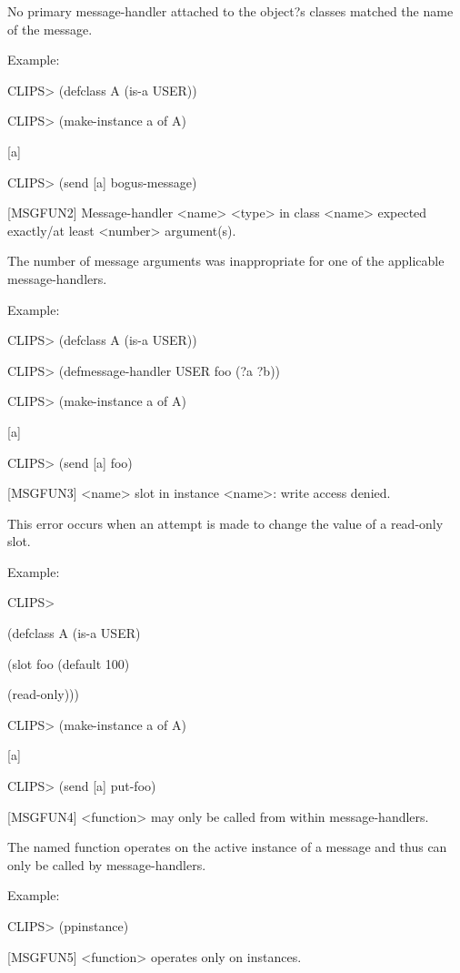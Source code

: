 \documentclass[letterpaper,10pt,english]{sphinxmanual}
\begin{document}
No primary message-handler attached to the object?s classes matched the
name of the message.

Example:

CLIPS\textgreater{} (defclass A (is-a USER))

CLIPS\textgreater{} (make-instance a of A)

{[}a{]}

CLIPS\textgreater{} (send {[}a{]} bogus-message)

{[}MSGFUN2{]} Message-handler \textless{}name\textgreater{} \textless{}type\textgreater{} in class \textless{}name\textgreater{} expected
exactly/at least \textless{}number\textgreater{} argument(s).

The number of message arguments was inappropriate for one of the
applicable message-handlers.

Example:

CLIPS\textgreater{} (defclass A (is-a USER))

CLIPS\textgreater{} (defmessage-handler USER foo (?a ?b))

CLIPS\textgreater{} (make-instance a of A)

{[}a{]}

CLIPS\textgreater{} (send {[}a{]} foo)

{[}MSGFUN3{]} \textless{}name\textgreater{} slot in instance \textless{}name\textgreater{}: write access denied.

This error occurs when an attempt is made to change the value of a
read-only slot.

Example:

CLIPS\textgreater{}

(defclass A (is-a USER)

(slot foo (default 100)

(read-only)))

CLIPS\textgreater{} (make-instance a of A)

{[}a{]}

CLIPS\textgreater{} (send {[}a{]} put-foo)

{[}MSGFUN4{]} \textless{}function\textgreater{} may only be called from within message-handlers.

The named function operates on the active instance of a message and thus
can only be called by message-handlers.

Example:

CLIPS\textgreater{} (ppinstance)

{[}MSGFUN5{]} \textless{}function\textgreater{} operates only on instances.
\end{document}
